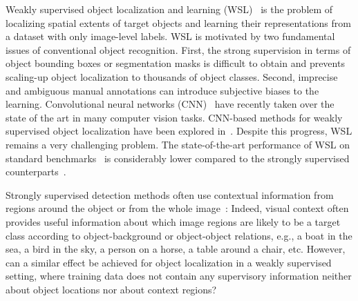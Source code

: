 \documentclass[runningheads]{llncs}
\begin{document}
Weakly supervised object localization and learning
(WSL)~\cite{Wang:2014tg,Cinbis:2015wn} is the problem of localizing spatial
extents of target objects and learning their representations from a dataset with
only image-level labels. %
WSL is motivated by two fundamental issues of conventional object recognition.
First, the strong supervision in terms of object bounding boxes or segmentation
masks is difficult to obtain and prevents scaling-up object localization to
thousands of object classes. Second, imprecise and ambiguous manual annotations
can introduce subjective biases to the learning. 
Convolutional neural networks (CNN)~\cite{LeCun:1989bx,Krizhevsky:2012wl}
have recently taken over the state of the art in many computer vision tasks.
CNN-based methods for weakly supervised object localization have been explored
in~\cite{Oquab:2015us,Bilen:2015uo}.
Despite this progress, WSL remains a very challenging problem. The state-of-the-art performance
of WSL on standard benchmarks~\cite{Wang:2014tg,Cinbis:2015wn,Bilen:2015uo} is considerably lower compared to the
strongly supervised counterparts~\cite{Girshick:2016ig,ren15fasterrcnn,Gidaris:2015cx}. 


Strongly supervised detection methods often use contextual information from regions around the object or from the whole 
image~\cite{Torralba:2003wk,Rabinovich:2007wy,Felzenszwalb:2009wx,Girshick:2016ig,Gidaris:2015cx, desai09}:
Indeed, visual context often provides useful information about which image regions are likely to
be a target class according to object-background or object-object relations,
e.g., a boat in the sea, a bird in the sky, a person on a horse, a table around
a chair, etc. However, can a similar effect be achieved for object localization
in a weakly supervised setting, where training data does not contain any
supervisory information neither about object locations nor about context regions?
\end{document}
